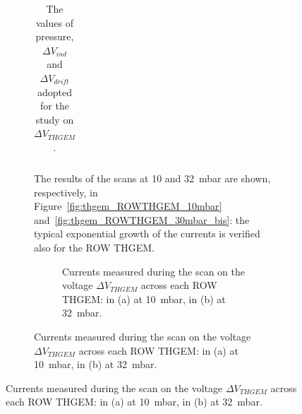 \documentclass[a4paper, 11 pt]{article}
\newcommand{\Vind}{$\Delta V_{ind}$}
\newcommand{\Vthgem}{$\Delta V_{THGEM}$}
\newcommand{\Vdrift}{$ \Delta V_{drift}$}
\begin{document}
\begin{figure}[htbp]
\begin{figure}[htbp]
\begin{table} [htbp]
\begin{center}
\begin{tabular} {ccccccc}
			
			\bottomrule[0.1em]
		\end{tabular}
	\end{center}
	\caption{The values of pressure, \Vind{} and \Vdrift{} adopted for the study on \Vthgem.} \label{tab:ROWTHGEM_vthgem}
\end{table}


The results of the scans at 10 and 32~mbar are shown, respectively, in Figure~\ref{fig:thgem_ROWTHGEM_10mbar} and~\ref{fig:thgem_ROWTHGEM_30mbar_bis}: the typical exponential growth of the currents is verified also for the ROW THGEM.
 

\begin{figure}[!htb]
	\centering
	\caption{Currents measured during the scan on the voltage \Vthgem{} across each ROW THGEM: in (a) at 10~mbar, in (b) at 32~mbar.}
	\label{fig:thgem_ROWTHGEM}
\end{figure}



\end{figure}
\end{figure}
\end{document}
